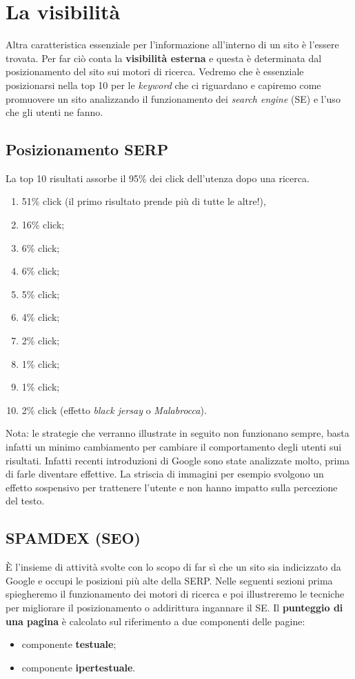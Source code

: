 
\chapter{La visibilità}

Altra caratteristica essenziale per l'informazione all'interno di un sito è l'essere trovata. Per far ciò conta la \textbf{visibilità esterna} e questa è determinata dal posizionamento del sito sui motori di ricerca. 
	Vedremo che è essenziale posizionarsi nella top 10 per le \emph{keyword} che ci riguardano e capiremo come promuovere un sito analizzando il funzionamento dei \emph{search engine} (SE) e l'uso che gli utenti ne fanno.

	\section{Posizionamento SERP}	
		La top 10 risultati assorbe il 95\% dei click dell'utenza dopo una ricerca.
		\begin{enumerate}
			\item 51\% click (il primo risultato prende più di tutte le altre!),
			\item 16\% click;
			\item 6\% click;
			\item 6\% click;
			\item 5\% click;
			\item 4\% click;
			\item 2\% click;
			\item 1\% click;
			\item 1\% click;
			\item 2\% click (effetto \emph{black jersay} o \emph{Malabrocca}).		
		\end{enumerate}
		
		Nota: le strategie che verranno illustrate in seguito non funzionano sempre, basta infatti un minimo cambiamento per cambiare il comportamento degli utenti sui risultati. Infatti recenti introduzioni di Google sono state analizzate molto, prima di farle diventare effettive. La striscia di immagini per esempio svolgono un effetto sospensivo per trattenere l'utente e non hanno impatto sulla percezione del testo.
	
	\section{SPAMDEX (SEO)}
		È l'insieme di attività svolte con lo scopo di far sì che un sito sia indicizzato da Google e occupi le posizioni più alte della SERP. Nelle seguenti sezioni prima spiegheremo il funzionamento dei motori di ricerca e poi illustreremo le tecniche per migliorare il posizionamento o addirittura ingannare il SE.
		Il \textbf{punteggio di una pagina} è calcolato sul riferimento a due componenti delle pagine:
		\begin{itemize}
			\item componente \textbf{testuale};
			\item componente \textbf{ipertestuale}.
		\end{itemize}
		
